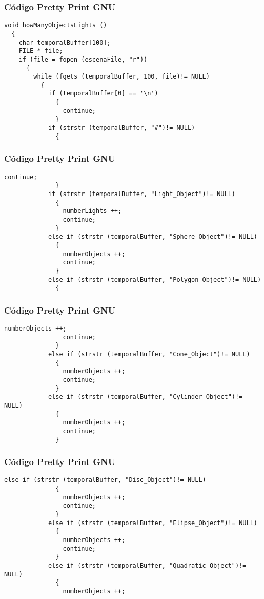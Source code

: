 \documentclass{beamer}
\begin{document}
\begin{frame}[fragile]
\frametitle{C\'odigo Pretty Print GNU}
\begin{lstlisting}[style=CStyle]
void howManyObjectsLights ()
  {
    char temporalBuffer[100];
    FILE * file;
    if (file = fopen (escenaFile, "r"))
      {
        while (fgets (temporalBuffer, 100, file)!= NULL)
          {
            if (temporalBuffer[0] == '\n')
              {
                continue;
              }
            if (strstr (temporalBuffer, "#")!= NULL)
              {
                \end{lstlisting}
\end{frame}
\begin{frame}[fragile]
\frametitle{C\'odigo Pretty Print GNU}
\begin{lstlisting}[style=CStyle]
                continue;
              }
            if (strstr (temporalBuffer, "Light_Object")!= NULL)
              {
                numberLights ++;
                continue;
              }
            else if (strstr (temporalBuffer, "Sphere_Object")!= NULL)
              {
                numberObjects ++;
                continue;
              }
            else if (strstr (temporalBuffer, "Polygon_Object")!= NULL)
              {
                \end{lstlisting}
\end{frame}
\begin{frame}[fragile]
\frametitle{C\'odigo Pretty Print GNU}
\begin{lstlisting}[style=CStyle]
                numberObjects ++;
                continue;
              }
            else if (strstr (temporalBuffer, "Cone_Object")!= NULL)
              {
                numberObjects ++;
                continue;
              }
            else if (strstr (temporalBuffer, "Cylinder_Object")!= NULL)
              {
                numberObjects ++;
                continue;
              }
\end{lstlisting}
\end{frame}
\begin{frame}[fragile]
\frametitle{C\'odigo Pretty Print GNU}
\begin{lstlisting}[style=CStyle]
            else if (strstr (temporalBuffer, "Disc_Object")!= NULL)
              {
                numberObjects ++;
                continue;
              }
            else if (strstr (temporalBuffer, "Elipse_Object")!= NULL)
              {
                numberObjects ++;
                continue;
              }
            else if (strstr (temporalBuffer, "Quadratic_Object")!= NULL)
              {
                numberObjects ++;
\end{lstlisting}
\end{frame}
\end{document}
